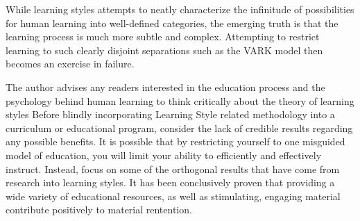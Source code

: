 \documentclass[12pt]{report}
\begin{document}
While learning styles attempts to neatly characterize the infinitude of
possibilities for human learning into well-defined categories, the emerging
truth is that the learning process is much more subtle and complex.  Attempting
to restrict learning to such clearly disjoint separations such as the VARK model
then becomes an exercise in failure.

The author advises any readers interested in the education process and the
psychology behind human learning to think critically about the theory of
learning styles Before blindly incorporating Learning Style related methodology
into a curriculum or educational program, consider the lack of credible results
regarding any possible benefits. It is possible that by restricting yourself to
one misguided model of education, you will limit your ability to efficiently and
effectively instruct. Instead, focus on some of the orthogonal results that have
come from research into learning styles.  It has been conclusively proven that
providing a wide variety of educational resources, as well as stimulating,
engaging material contribute positively to material rentention.


\end{document}

